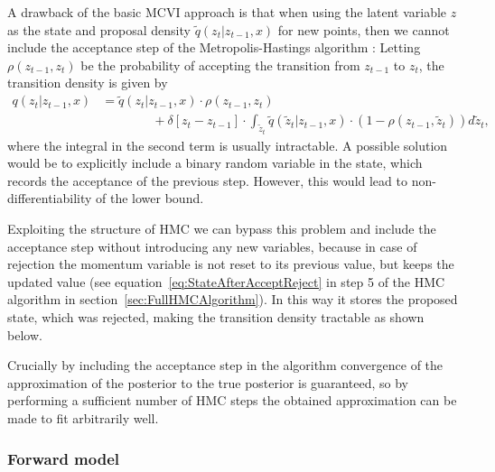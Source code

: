\documentclass[12pt]{scrartcl}
\begin{document}
A drawback of the basic MCVI approach is that when using the latent variable $z$ as the state and proposal density $\tilde{q}(z_t|z_{t-1}, x)$ for new points, then we cannot include the acceptance step of the Metropolis-Hastings algorithm \citep{Salimans2014}: Letting $\rho(z_{t-1}, z_t)$ be the probability of accepting the transition from $z_{t-1}$ to $z_t$, the transition density is given by
\begin{equation}
\begin{split}
q(z_t|z_{t-1}, x) &= \tilde{q}(z_t|z_{t-1}, x) \cdot \rho(z_{t-1}, z_t) \\
&\qquad\qquad + \delta[z_t - z_{t-1}] \cdot \int_{\tilde{z}_{t}} \tilde{q}(\tilde{z}_t|z_{t-1}, x) \cdot (1 - \rho(z_{t-1}, \tilde{z}_t)) d\tilde{z}_t,
\end{split}
\end{equation}
where the integral in the second term is usually intractable. A possible solution would be to explicitly include a binary random variable in the state, which records the acceptance of the previous step. However, this would lead to non-differentiability of the lower bound.

Exploiting the structure of HMC we can bypass this problem and include the acceptance step without introducing any new variables, because in case of rejection the momentum variable is not reset to its previous value, but keeps the updated value (see equation~\eqref{eq:StateAfterAcceptReject} in step 5 of the HMC algorithm in section~\ref{sec:FullHMCAlgorithm}). In this way it stores the proposed state, which was rejected, making the transition density tractable as shown below.

Crucially by including the acceptance step in the algorithm convergence of the approximation of the posterior to the true posterior is guaranteed, so by performing a sufficient number of HMC steps the obtained approximation can be made to fit arbitrarily well.

\subsubsection{Forward model}
\end{document}
